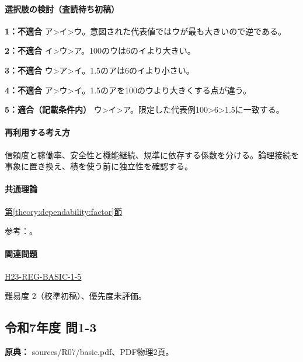 \paragraph{選択肢の検討（査読待ち初稿）}\mbox{}\par

\noindent\textbf{1：不適合} ア>イ>ウ。意図された代表値ではウが最も大きいので逆である。\par

\noindent\textbf{2：不適合} イ>ウ>ア。100のウは6のイより大きい。\par

\noindent\textbf{3：不適合} ウ>ア>イ。1.5のアは6のイより小さい。\par

\noindent\textbf{4：不適合} ア>ウ>イ。1.5のアを100のウより大きくする点が違う。\par

\noindent\textbf{5：適合（記載条件内）} ウ>イ>ア。限定した代表例100>6>1.5に一致する。\par

\paragraph{再利用する考え方} 信頼度と稼働率、安全性と機能継続、規準に依存する係数を分ける。論理接続を事象に置き換え、積を使う前に独立性を確認する。

\paragraph{共通理論} \hyperref[theory:dependability:factor]{第\ref*{theory:dependability:factor}節}

\par 参考：\cite{design_faa_2011,design_mhlw_crane,design_fsc_adi}。

\paragraph{関連問題} \hyperref[q:h23-reg-basic-1-5]{H23-REG-BASIC-1-5}

\par 難易度 2（校準初稿）、優先度未評価。

\subsection{令和7年度 問1-3}
\label{q:r07-reg-basic-1-3}

\noindent\textbf{原典：} sources/R07/basic.pdf、PDF物理2頁。

